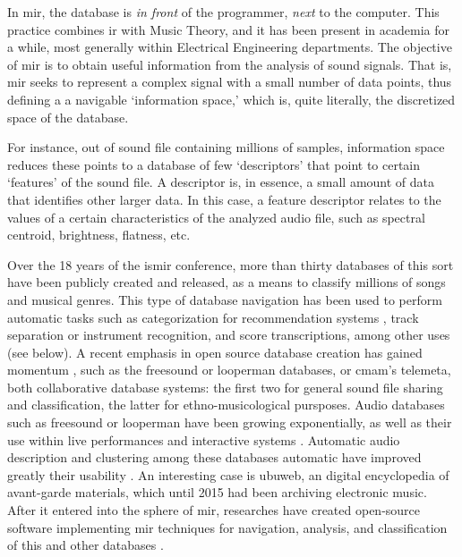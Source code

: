 
In \gls{mir}, the database is \textit{in front} of the programmer, \textit{next} to the computer. This practice combines \gls{ir} with Music Theory, and it has been present in academia for a while, most generally within Electrical Engineering departments. The objective of \gls{mir} is to obtain useful information from the analysis of sound signals. That is, \gls{mir} seeks to represent a complex signal with a small number of data points, thus defining a a navigable `information space,' which is, quite literally, the discretized space of the database.


For instance, out of sound file containing millions of samples, information space reduces these points to a database of few `descriptors' that point to certain `features' of the sound file. A descriptor is, in essence, a small amount of data that identifies other larger data. In this case, a feature descriptor relates to the values of a certain characteristics of the analyzed audio file, such as spectral centroid, brightness, flatness, etc. 

Over the 18 years of the \gls{ismir} conference, more than thirty databases of this sort have been publicly created and released, as a means to classify millions of songs and musical genres. This type of database navigation has been used to perform automatic tasks such as categorization for recommendation systems \parencite{DBLP:journals/corr/abs-0812-4235, asmita_poddar_2018_1422565}, track separation or instrument recognition, and score transcriptions, among other uses (see below). A recent emphasis in open source database creation has gained momentum \parencite{DBLP:conf/ismir/FonsecaPFFBFOPS17}, such as the \gls{freesound} or \gls{looperman} databases, or \gls{cmam}'s \gls{telemeta}, both collaborative database systems: the first two for general sound file sharing and classification, the latter for ethno-musicological pursposes. Audio databases such as \gls{freesound} or \gls{looperman} have been growing exponentially, as well as their use within live performances and interactive systems \parencite{nuno_n_correia_2010_849729}. Automatic audio description and clustering among these databases automatic have improved greatly their usability \parencite{gerard_roma_2012_850102}. An interesting case is \gls{ubuweb}, an digital encyclopedia of avant-garde materials, which until 2015 had been archiving electronic music. After it entered into the sphere of \gls{mir}, researches have created open-source software implementing \gls{mir} techniques for navigation, analysis, and classification of this and other databases \parencite{collins_2015}.

